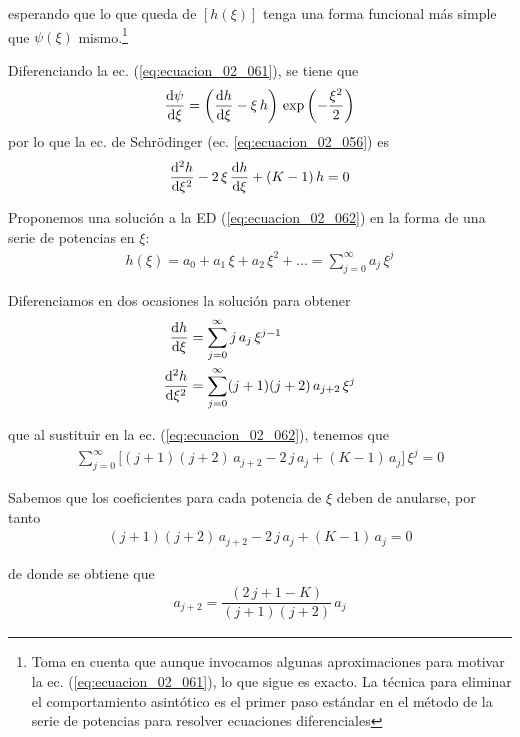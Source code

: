 esperando que lo que queda de $[h (\xi)]$ tenga una forma funcional más simple que $\psi (\xi)$ mismo.\footnote{Toma en cuenta que aunque invocamos algunas aproximaciones para motivar la ec. (\ref{eq:ecuacion_02_061}), lo que sigue es exacto. La técnica para eliminar el comportamiento asintótico es el primer paso estándar en el método de la serie de potencias para resolver ecuaciones diferenciales}
\par
Diferenciando la ec. (\ref{eq:ecuacion_02_061}), se tiene que
\begin{align*}
\dv{\psi}{\xi} = \left( \dv{h}{\xi} - \xi \, h \right) \, \exp \left( - \dfrac{\xi^{2}}{2} \right)
\end{align*}
por lo que la ec. de Schrödinger (ec. \ref{eq:ecuacion_02_056}) es
\begin{align}
\dv[2]{h}{\xi} - 2 \, \xi \, \dv{h}{\xi} +  (K - 1) \, h = 0
\label{eq:ecuacion_02_062}
\end{align}

Proponemos una solución a la ED (\ref{eq:ecuacion_02_062}) en la forma de una serie de potencias en $\xi$:
\begin{align}
h (\xi) = a_{0} + a_{1} \, \xi + a_{2} \, \xi^{2} + \ldots = \sum_{j=0}^{\infty} a_{j} \, \xi^{j}
\label{eq:ecuacion_02_063}
\end{align}

Diferenciamos en dos ocasiones la solución para obtener
\begin{align*}
\dv{h}{\xi} &= \sum_{j=0}^{\infty} j \, a_{j} \, \xi^{j-1} \\
\dv[2]{h}{\xi} &= \sum_{j=0}^{\infty} (j + 1)(j + 2) \, a_{j+2} \, \xi^{j}
\end{align*}

que al sustituir en la ec. (\ref{eq:ecuacion_02_062}), tenemos que
\begin{align}
\sum_{j=0}^{\infty} \bigg[ (j + 1)(j + 2) \, a_{j+2} - 2 \, j \, a_{j} +  (K - 1) \, a_{j} \bigg] \, \xi^{j} = 0
\label{eq:ecuacion_02_64}
\end{align}

Sabemos que los coeficientes para cada potencia de $\xi$ deben de anularse, por tanto
\begin{align*}
(j + 1)(j + 2) \, a_{j+2} - 2 \, j \, a_{j} +  (K - 1) \, a_{j} = 0
\end{align*}

de donde se obtiene que
\begin{align}
a_{j+2} = \dfrac{(2 \, j + 1 - K)}{(j + 1)(j + 2)} \, a_{j}
\label{eq:ecuacion_02_065}
\end{align}

